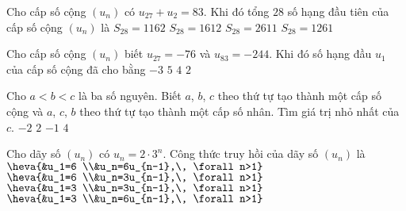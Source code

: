 \begin{ex}%
	Cho cấp số cộng $\left( u_n \right)$ có $u_{27}+u_2=83$. Khi đó tổng $28$ số hạng đầu tiên của cấp số cộng $\left( u_n \right)$ là
	\choice
	{\True $S_{28}=1162$}
	{$S_{28}=1612$}
	{$S_{28}=2611$}
	{$S_{28}=1261$}
\end{ex}
\begin{ex}%
	Cho cấp số cộng $\left( u_n \right)$ biết $u_{27}=-76$ và $u_{83}=-244$. Khi đó số hạng đầu $u_1$ của cấp số cộng đã cho bằng
	\choice
	{$-3$}
	{$5$}
	{$4$}
	{\True $2$}
\end{ex}
\begin{ex}%
	Cho $a<b<c$ là ba số nguyên. Biết $a$, $b$, $c$ theo thứ tự tạo thành một cấp số cộng và $a$, $c$, $b$ theo thứ tự tạo thành một cấp số nhân. Tìm giá trị nhỏ nhất của $c$.
	\choice
	{$-2$}
	{\True $2$}
	{$-1$}
	{$4$}
\end{ex}
\begin{ex}%
	Cho dãy số $(u_n)$ có $u_n=2\cdot 3^n$. Công thức truy hồi của dãy số $(u_n)$ là 
	\choice
	{$\heva{&u_1=6	\\&u_n=6u_{n-1},\, \forall n>1}$}
	{\True $\heva{&u_1=6	\\&u_n=3u_{n-1},\, \forall n>1}$}
	{$\heva{&u_1=3	\\&u_n=3u_{n-1},\, \forall n>1}$}
	{$\heva{&u_1=3	\\&u_n=6u_{n-1},\, \forall n>1}$}
\end{ex}
